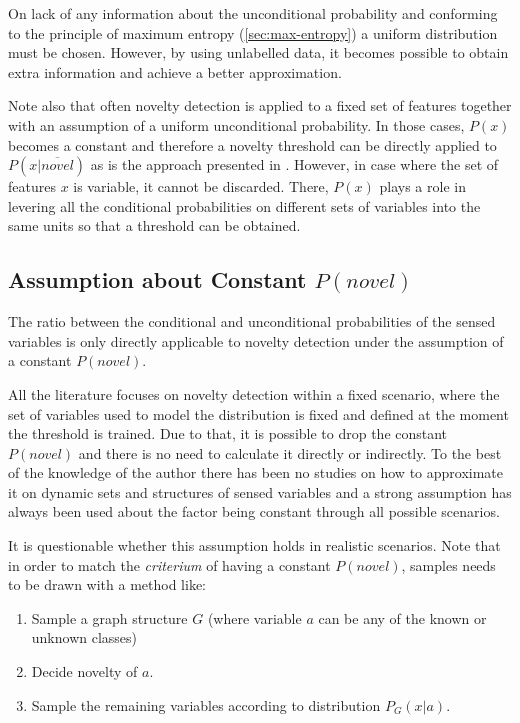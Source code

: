 On lack of any information about the unconditional probability and conforming to
the principle of maximum entropy (\autoref{sec:max-entropy}) a uniform
distribution must be chosen. However, by using unlabelled data, it becomes possible 
to obtain extra information and achieve a better approximation.


Note also that often novelty detection is applied to a fixed set of features
together with an assumption of a uniform unconditional probability.
In those cases, $P(x)$ becomes a constant and therefore a novelty threshold
can be directly applied to $P(x|\overline{novel})$ as is the approach presented in \cite{bishop1994novelty}.
However, in case where the set of features $x$ is variable, it cannot be
discarded. There, $P(x)$ plays a role in levering all the conditional
probabilities on different sets of variables into the same units so that a threshold can be obtained.


\subsection{Assumption about Constant $P(novel)$}
The ratio between the conditional and unconditional probabilities of the sensed variables
is only directly applicable to novelty detection under the assumption of a constant $P(novel)$.

All the literature focuses on novelty detection within a fixed scenario, where the set of variables
used to model the distribution is fixed and defined at the moment the threshold is trained.
Due to that, it is possible to drop the constant $P(novel)$ and there is no need to calculate
it directly or indirectly.
To the best of the knowledge of the author there has been no studies on how to approximate it on dynamic
sets and structures of sensed variables and a strong assumption has always been used about the factor being 
constant through all possible scenarios.

It is questionable whether this assumption holds in realistic scenarios. Note that in order to match the 
\emph{criterium} of having a constant $P(novel)$, samples needs to be drawn with a method like:

\begin{algorithm}
\begin{enumerate}
\item Sample a graph structure $G$ (where variable $a$ can be any of the known or unknown classes)
\item Decide novelty of $a$.
\item Sample the remaining variables according to distribution $P_G(x|a)$.
\end{enumerate}
\end{algorithm}

